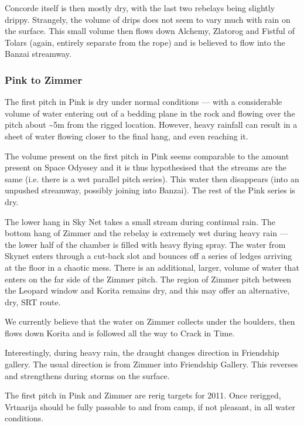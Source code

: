 \documentclass[english,a4]{article}
\begin{document}
Concorde itself is then mostly dry, with the last two rebelays being
slightly drippy. Strangely, the volume of drips does not seem to vary
much with rain on the surface. This small volume then flows 
down Alchemy, Zlatorog and Fistful of Tolars (again, entirely separate
from the rope) and is believed to flow into the Banzai streamway.

\subsubsection{Pink to Zimmer}

The first pitch in Pink is dry under normal conditions --- with a considerable
volume of water entering out of a bedding plane in the rock and flowing over
the pitch about \textasciitilde{}5m from the rigged location. However, heavy
rainfall can result in a sheet of water flowing closer to the final hang, and
even reaching it. 

The volume present on the first pitch in Pink seems comparable to the amount
present on Space Odyssey and it is thus hypothesised that the streams are the
same (i.e. there is a wet parallel pitch series). This water then disappears
(into an unpushed streamway, possibly joining into Banzai). The rest of the
Pink series is dry.

The lower hang in Sky Net takes a small stream during continual rain. The
bottom hang of Zimmer and the rebelay is extremely wet during heavy rain
--- the lower half of the chamber is filled with heavy
flying spray. The water from Skynet enters through a cut-back slot and bounces
off a series of ledges arriving at the floor in a chaotic mess. 
There is an additional, larger, volume of water that enters on the far side of
the Zimmer pitch. The region of Zimmer pitch between the Leopard window and Korita
remains dry, and this may offer an alternative, dry, SRT route. 

We currently believe that the water on Zimmer collects under the boulders, then
flows down Korita and is followed all the way to Crack in Time.

Interestingly, during heavy rain, the draught changes direction in
Friendship gallery. The usual direction is from Zimmer into Friendship Gallery.
This reverses and strengthens during storms on the surface.

The first pitch in Pink and Zimmer are rerig targets for 2011. Once
rerigged, Vrtnarija should be fully passable to and from camp, if not pleasant,
in all water conditions.
\end{document}
